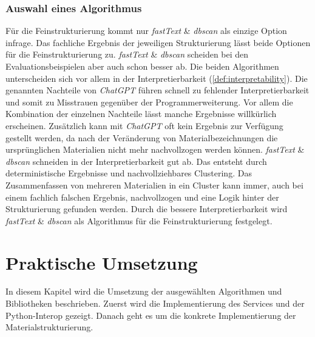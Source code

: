 \subsection{Auswahl eines Algorithmus}
\label{c:comparison:fine-structuring:selection}
Für die Feinstrukturierung kommt nur \textit{fastText} \& \textit{\ac{dbscan}} als einzige Option infrage. Das fachliche Ergebnis der jeweiligen Strukturierung lässt beide Optionen für die Feinstrukturierung zu. \textit{fastText} \& \textit{\ac{dbscan}} scheiden bei den Evaluationsbeispielen aber auch schon besser ab. Die beiden Algorithmen unterscheiden sich vor allem in der Interpretierbarkeit (\autoref{def:interpretability}). Die genannten Nachteile von \textit{ChatGPT} führen schnell zu fehlender Interpretierbarkeit und somit zu Misstrauen gegenüber der Programmerweiterung.
Vor allem die Kombination der einzelnen Nachteile lässt manche Ergebnisse willkürlich erscheinen. Zusätzlich kann mit \textit{ChatGPT} oft kein Ergebnis zur Verfügung gestellt werden, da nach der Veränderung von Materialbezeichnungen die ursprünglichen Materialien nicht mehr nachvollzogen werden können.
\textit{fastText} \& \textit{\ac{dbscan}} schneiden in der Interpretierbarkeit gut ab. Das entsteht durch deterministische Ergebnisse und nachvollziehbares Clustering. Das Zusammenfassen von mehreren Materialien in ein Cluster kann immer, auch bei einem fachlich falschen Ergebnis, nachvollzogen und eine Logik hinter der Strukturierung gefunden werden. Durch die bessere Interpretierbarkeit wird \textit{fastText} \& \textit{\ac{dbscan}} als Algorithmus für die Feinstrukturierung festgelegt.

\chapter{Praktische Umsetzung}
\label{c:implementation}
In diesem Kapitel wird die Umsetzung der ausgewählten Algorithmen und Bibliotheken beschrieben. Zuerst wird die Implementierung des Services und der Python-Interop gezeigt. Danach geht es um die konkrete Implementierung der Materialstrukturierung.

